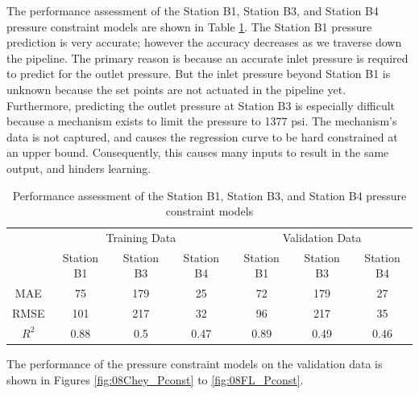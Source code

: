 The performance assessment of the Station B1, Station B3, and Station B4 pressure constraint models are shown in Table \ref{tab:08pres_const_performance}. The Station B1 pressure prediction is very accurate; however the accuracy decreases as we traverse down the pipeline.  The primary reason is because an accurate inlet pressure is required to predict for the outlet pressure.  But the inlet pressure beyond Station B1 is unknown because the set points are not actuated in the pipeline yet. Furthermore, predicting the outlet pressure at Station B3 is especially difficult because a mechanism exists to limit the pressure to 1377 psi.  The mechanism's data is not captured, and causes the regression curve to be hard constrained at an upper bound. Consequently, this causes many inputs to result in the same output, and hinders learning.

\begin{table}[h]
    \centering
    {
    \begin{tabular}{c|c|c|c|c|c|c|}
    \multicolumn{1}{l|}{} & \multicolumn{3}{c|}{Training Data} & \multicolumn{3}{c|}{Validation Data} \\ \cline{2-7} 
    \multicolumn{1}{l|}{} & Station B1   & Station B3   & Station B4  & Station B1    & Station B3   & Station B4   \\ \hline
    MAE                   & 75         & 179    & 25           & 72          & 179    & 27            \\
    RMSE                  & 101        & 217    & 32           & 96          & 217    & 35            \\
    $R^2$                 & 0.88       & 0.5    & 0.47         & 0.89        & 0.49   & 0.46         
    \end{tabular}}
    \caption{Performance assessment of the Station B1, Station B3, and Station B4 pressure constraint models}
    \label{tab:08pres_const_performance}
\end{table}

The performance of the pressure constraint models on the validation data is shown in Figures \ref{fig:08Chey_Pconst} to \ref{fig:08FL_Pconst}.

